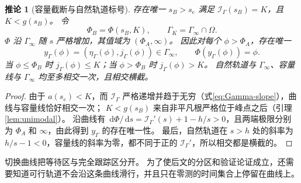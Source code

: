 \documentclass[11pt,a4paper,UTF8]{ctexart}
\newtheorem{corollary}[theorem]{推论}
\theoremstyle{definition}
\newcommand{\dd}{\,\mathrm d}
\begin{document}
\begin{corollary}[容量截断与自然轨道标号]
\label{cor:Gamma-labels}
存在唯一 $s_B>s_e$ 满足 $\mathcal I_\Gamma(s_B)=K$，且 $K<g(s_B)$。
令
\begin{equation}
\Phi_B=\Phi(s_B,K),\qquad \Gamma_K=\Gamma_\infty\cap\Omega.
\label{eq:PhiB}
\end{equation}
$\Phi$ 沿 $\Gamma_\infty$ 随 $s$ 严格增加，其值域为 $(\Phi_A,\infty)$。
因此对每个 $\phi>\Phi_A$，存在唯一
\begin{equation}
y_\Gamma(\phi)=(\eta_\Gamma(\phi),j_\Gamma(\phi))\in\Gamma_\infty,
\qquad \Phi(y_\Gamma(\phi))=\phi.
\label{eq:Gamma-hit-map}
\end{equation}
当 $\phi\le\Phi_B$ 时 $j_\Gamma(\phi)\le K$；当 $\phi>\Phi_B$ 时 $j_\Gamma(\phi)>K$。
自然轨道与 $\Gamma_\infty$、容量线与 $\Gamma_\infty$ 均至多相交一次，且相交横截。
\end{corollary}
\begin{proof}
由于 $a(s_e)<K$，而 $\mathcal I_\Gamma$ 严格递增并趋于无穷（式\eqref{eq:Gamma-slope}），曲线与容量线恰好相交一次；
$K<g(s_B)$ 来自非平凡根严格位于峰点之后（引理\ref{lem:unimodal}）。
沿曲线有 $\dd\Phi/\dd s=\mathcal I_\Gamma'(s)+1-h/s>0$，且两端极限分别为 $\Phi_A$ 和 $\infty$，由此得到 $y_\Gamma$ 的存在唯一性。
最后，自然轨道在 $s>h$ 处的斜率为 $h/s-1<0$，容量线的斜率为零，都不同于正的 $\mathcal I_\Gamma'$，所以相交都是横截的。
\end{proof}

切换曲线把等待区与完全跟踪区分开。
为了使后文的分区和验证论证成立，还需要知道可行轨道不会沿这条曲线滑行，并且只在零测的时间集合上停留在曲线上。
\end{document}
